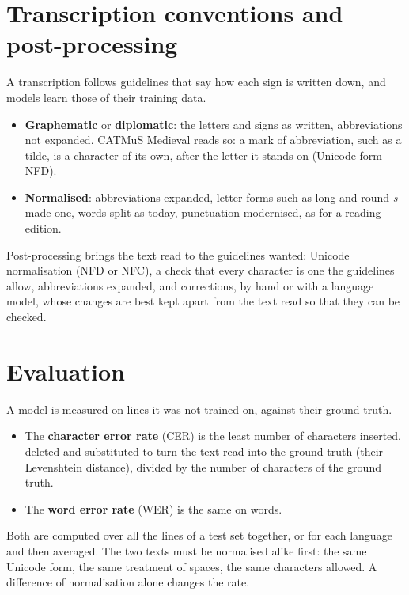 \section{Transcription conventions and post-processing}\label{sec:conventions}
A transcription follows guidelines that say how each sign is written down, and models learn those of their training
data.
\begin{itemize}
  \item \textbf{Graphematic} or \textbf{diplomatic}: the letters and signs as written, abbreviations not expanded.
    CATMuS Medieval reads so: a mark of abbreviation, such as a tilde, is a character of its own, after the letter it
    stands on (Unicode form NFD).
  \item \textbf{Normalised}: abbreviations expanded, letter forms such as long and round \emph{s} made one, words
    split as today, punctuation modernised, as for a reading edition.
\end{itemize}
Post-processing brings the text read to the guidelines wanted: Unicode normalisation (NFD or NFC), a check that every
character is one the guidelines allow, abbreviations expanded, and corrections, by hand or with a language model,
whose changes are best kept apart from the text read so that they can be checked.

\section{Evaluation}\label{sec:evaluation}
A model is measured on lines it was not trained on, against their ground truth.
\begin{itemize}
  \item The \textbf{character error rate} (CER) is the least number of characters inserted, deleted and substituted
    to turn the text read into the ground truth (their Levenshtein distance), divided by the number of characters
    of the ground truth.
  \item The \textbf{word error rate} (WER) is the same on words.
\end{itemize}
Both are computed over all the lines of a test set together, or for each language and then averaged. The two texts
must be normalised alike first: the same Unicode form, the same treatment of spaces, the same characters allowed.
A difference of normalisation alone changes the rate.

